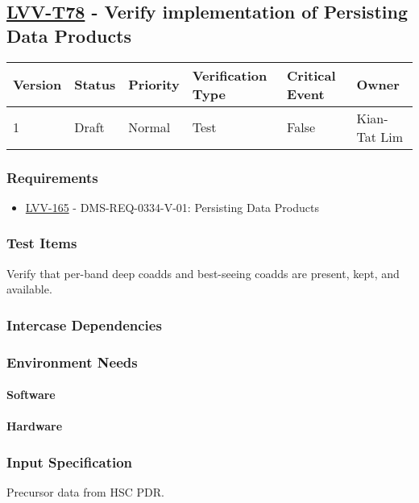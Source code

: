 \subsection{\href{https://jira.lsstcorp.org/secure/Tests.jspa\#/testCase/LVV-T78}{LVV-T78}
    - Verify implementation of Persisting Data Products}\label{lvv-t78}

\begin{longtable}[]{llllll}
\toprule
Version & Status & Priority & Verification Type & Critical Event & Owner
\\\midrule
1 & Draft & Normal &
Test & False & Kian-Tat Lim
\\\bottomrule
\end{longtable}

\subsubsection{Requirements}
\begin{itemize}
\item \href{https://jira.lsstcorp.org/browse/LVV-165}{LVV-165} - DMS-REQ-0334-V-01: Persisting Data Products
\end{itemize}

\subsubsection{Test Items}
Verify that per-band deep coadds and best-seeing coadds are present,
kept, and available.



\subsubsection{Intercase Dependencies}

\subsubsection{Environment Needs}

\paragraph{Software}

\paragraph{Hardware}

\subsubsection{Input Specification}
Precursor data from HSC PDR.


